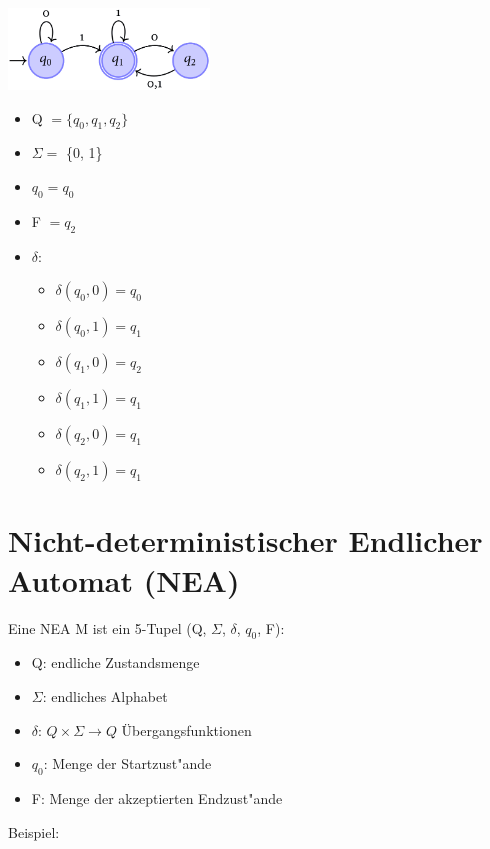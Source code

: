 \documentclass[11pt, a4paper]{scrartcl}
\begin{document}
\includegraphics[width=0.4\textwidth]{DEA-00.png}

\begin{itemize}
    \item Q $= \{q_0, q_1, q_2\}$
    \item $\Sigma =$ \{0, 1\}
    \item $q_0 = q_0$
    \item F $= q_2$
    \item $\delta$:
    \begin{itemize}[label={}]
        \item $\delta(q_0, 0) = q_0$
        \item $\delta(q_0, 1) = q_1$
        \item $\delta(q_1, 0) = q_2$
        \item $\delta(q_1, 1) = q_1$
        \item $\delta(q_2, 0) = q_1$
        \item $\delta(q_2, 1) = q_1$
      \end{itemize}
\end{itemize}

\newpage

\section{Nicht-deterministischer Endlicher Automat (NEA)}

Eine NEA M ist ein 5-Tupel (Q, $\Sigma$, $\delta$, $q_0$, F):

\begin{itemize}
    \item Q: endliche Zustandsmenge
    \item $\Sigma$: endliches Alphabet
    \item $\delta$: $Q \times \Sigma \rightarrow Q$ Übergangsfunktionen
    \item $q_0$: Menge der Startzust"ande
    \item F: Menge der akzeptierten Endzust"ande
\end{itemize}

\vspace{2em}
Beispiel:
\vspace{1em}
\end{document}
